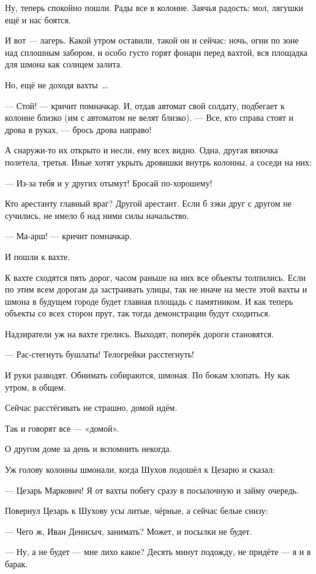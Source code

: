 Ну, теперь спокойно пошли. Рады все в колонне. Заячья радость: мол, лягушки ещё и нас боятся.

И вот --- лагерь. Какой утром оставили, такой он и сейчас: ночь, огни по зоне над сплошным 
забором, и особо густо горят фонари перед вахтой, вся площадка для шмона как солнцем залита.

Но, ещё не доходя вахты~\dots{}

--- Стой! --- кричит помначкар. И, отдав автомат свой солдату, подбегает к колонне близко (им с 
автоматом не велят близко). --- Все, кто справа стоят и дрова в руках, --- брось дрова направо!

А снаружи-то их открыто и несли, ему всех видно. Одна, другая вязочка полетела, третья. Иные 
хотят укрыть дровишки внутрь колонны, а соседи на них:

--- Из-за тебя и у других отымут! Бросай по-хорошему!

Кто арестанту главный враг? Другой арестант. Если б зэки друг с другом не сучились, не имело б 
над ними силы начальство.

--- Ма-арш! --- кричит помначкар.

И пошли к вахте.

К вахте сходятся пять дорог, часом раньше на них все объекты толпились. Если по этим всем 
дорогам да застраивать улицы, так не иначе на месте этой вахты и шмона в будущем городе будет 
главная площадь с памятником. И как теперь объекты со всех сторон прут, так тогда 
демонстрации будут сходиться.

Надзиратели уж на вахте грелись. Выходят, поперёк дороги становятся.

--- Рас-стегнуть бушлаты! Телогрейки расстегнуть!

И руки разводят. Обнимать собираются, шмоная. По бокам хлопать. Ну как утром, в общем.

Сейчас расстёгивать не страшно, домой идём.

Так и говорят все --- «домой».

О другом доме за день и вспомнить некогда.

Уж голову колонны шмонали, когда Шухов подошёл к Цезарю и сказал:

--- Цезарь Маркович! Я от вахты побегу сразу в посылочную и займу очередь.

Повернул Цезарь к Шухову усы литые, чёрные, а сейчас белые снизу:

--- Чего ж, Иван Денисыч, занимать? Может, и посылки не будет.

--- Ну, а не будет --- мне лихо какое? Десять минут подожду, не придёте --- я и в барак.

